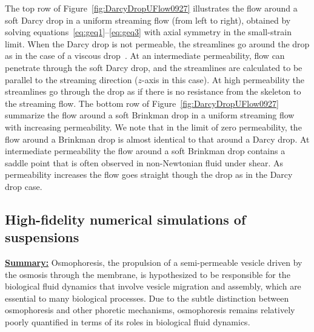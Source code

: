 \documentclass[11pt]{article}
\begin{document}
The top row of Figure~\ref{fig:DarcyDropUFlow0927} illustrates the flow
around a soft Darcy drop in a uniform streaming flow (from left to
right), obtained by solving equations~\eqref{eq:geq1}--\eqref{eq:geq3}
with axial symmetry in the small-strain limit. When the Darcy drop is
not permeable, the streamlines go around the drop as in the case of a
viscous drop~\cite{DavisStone1993_CES,
GLeal_AdvancedTransportPhenomena}. At an intermediate permeability, flow
can penetrate through the soft Darcy drop, and the streamlines are
calculated to be parallel to the streaming direction ($z$-axis in this
case). At high permeability the streamlines go through the drop as if
there is no resistance from the skeleton to the streaming flow.  The
bottom row of Figure~\ref{fig:DarcyDropUFlow0927} summarize the flow
around a soft Brinkman drop in a uniform streaming flow with increasing
permeability.  We note that in the limit of zero permeability, the flow
around a Brinkman drop is almost identical to that around a Darcy drop.
At intermediate permeability the flow around a soft Brinkman drop
contains a saddle point that is often observed in non-Newtonian fluid
under shear.  As permeability increases the flow goes straight though
the drop as in the Darcy drop case.

\subsection{High-fidelity numerical simulations of suspensions} 
\label{subsec:numerics}

\noindent
\underline{{\bf Summary:}}
Osmophoresis, the propulsion of a semi-permeable vesicle driven by the
osmosis through the membrane, is hypothesized to be responsible for the
biological fluid dynamics that involve vesicle migration and assembly,
which are essential to many biological processes.  Due to the subtle
distinction between osmophoresis and other phoretic mechanisms,
osmophoresis remains relatively poorly quantified in terms of its roles
in biological fluid dynamics. 
\end{document}

